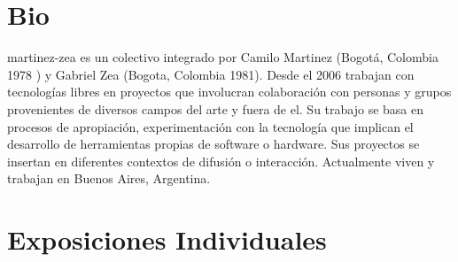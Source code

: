 \documentclass[10pt,letter]{moderncv}
\begin{document}
\maketitle

\section{Bio}
{}{martinez-zea es un colectivo integrado por Camilo Martinez (Bogotá, Colombia 1978 ) y Gabriel Zea (Bogota, Colombia 1981). Desde el 2006 trabajan con tecnologías libres en proyectos que involucran colaboración con personas y grupos provenientes de diversos campos del arte y fuera de el. Su trabajo se basa en procesos de apropiación, experimentación con la tecnología que implican el desarrollo de herramientas propias de software o hardware. Sus proyectos se insertan en diferentes contextos de difusión o interacción. Actualmente viven y trabajan en Buenos Aires, Argentina.}{}{}{}{}


\section{Exposiciones Individuales}

\end{document}
